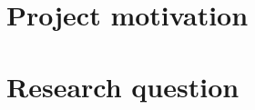 

\section{Project motivation}
\label{chapter1-project-motivation}


\section{Research question}
\label{chapter1-research-question}


